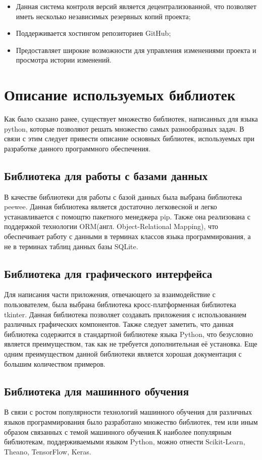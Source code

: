 \begin{itemize}
	\item Данная система контроля версий является децентрализованной, что позволяет иметь несколько независимых резервных копий проекта;
	\item Поддерживается хостингом репозиториев GitHub;
	\item Предоставляет широкие возможности для управления изменениями проекта и просмотра истории изменений.
\end{itemize}


\section{Описание используемых библиотек}

Как было сказано ранее, существует множество библиотек, написанных для языка python, которые позволяют решать множество самых разнообразных задач. В связи с этим следует привести описание основных библиотек, используемых при разработке данного программного обеспечения.

\subsection{Библиотека для работы с базами данных}
В качестве библиотеки для работы с базой данных была выбрана библиотека peewee. Данная библиотека является достаточно легковесной и легко устанавливается с помощтю пакетного менеджера pip. Также она реализована с поддержкой технологии ORM(англ. Object-Relational Mapping), %
что обеспечивает работу с данными в терминах классов языка программирования, а не в терминах таблиц данных базы SQLite.

\subsection{Библиотека для графического интерфейса}
Для написания части приложения, отвечающего за взаимодействие с пользователем, была выбрана библиотека кросс-платформенная библиотека tkinter. Данная библиотека 
позволяет создавать приложения с использованием различных графических компонентов. Также следует заметить, что данная библиотека содержится в стандартной библиотеке языка Python, что безусловно является преимуществом, так как не требуется дополнительная её установка. Еще одним преимуществом данной библиотеки является хорошая документация с большим количеством примеров.

\subsection{Библиотека для машинного обучения}
В связи с ростом популярности технологий машинного обучения для различных языков программирования было разработано множество библиотек, тем или иным образом связанных с темой машинного обучения.К наиболее популярным библиотекам, поддерживаемыми языком Python, можно отнести Scikit-Learn, Theano, TensorFlow, Keras.

